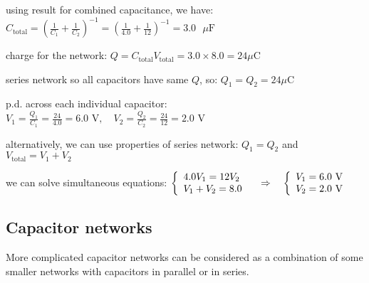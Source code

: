 \begin{soln} using result for combined capacitance, we have: $C_\text{total} = \left( \frac{1}{C_1} + \frac{1}{C_2} \right)^{-1} = \left( \frac{1}{4.0} + \frac{1}{12} \right)^{-1} = 3.0 \text{ }\mu\text{F}$

charge for the network: $Q = C_\text{total} V_\text{total} = 3.0 \times 8.0 = 24 \mu\text{C}$

series network so all capacitors have same $Q$, so: $Q_1=Q_2=24 \mu\text{C}$

p.d. across each individual capacitor: $V_1 = \frac{Q_1}{C_1} = \frac{24}{4.0} = 6.0 \text{ V}, \quad V_2 = \frac{Q_2}{C_2} = \frac{24}{12} = 2.0 \text{ V}$

alternatively, we can use properties of series network: $Q_1 = Q_2$ and $V_\text{total} = V_1+V_2$

we can solve simultaneous equations: $\left\{\begin{array}{l}
4.0V_1 = 12 V_2 \\
V_1 + V_2 = 8.0
\end{array}\right. \quad \Rightarrow \quad 
\left\{\begin{array}{l}
V_1 = 6.0 \text{ V} \\
V_2 = 2.0 \text{ V}
\end{array}\right.$ \end{soln}



\subsection{Capacitor networks}

More complicated capacitor networks can be considered as a combination of some smaller networks with capacitors in parallel or in series.

